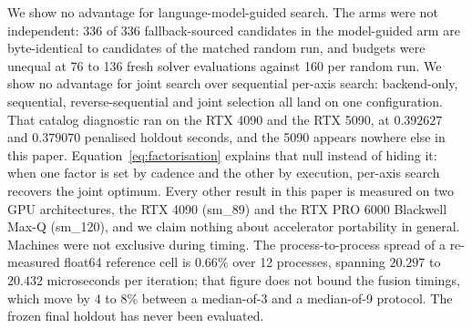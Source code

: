We show no advantage for language-model-guided search. The arms were not
independent: 336 of 336 fallback-sourced candidates in the model-guided arm are
byte-identical to candidates of the matched random run, and budgets were
unequal at 76 to 136 fresh solver evaluations against 160 per random run.
We show no advantage for joint search over sequential per-axis search:
backend-only, sequential, reverse-sequential and joint selection all land on one
configuration. That catalog diagnostic ran on the RTX 4090 and the RTX 5090, at
$0.392627$ and $0.379070$ penalised holdout seconds, and the 5090 appears
nowhere else in this paper.
Equation~\ref{eq:factorisation} explains that null instead of hiding it: when
one factor is set by cadence and the other by execution, per-axis search
recovers the joint optimum. Every other result in this paper is measured on two
GPU architectures, the RTX 4090 (sm\_89) and the RTX PRO 6000 Blackwell Max-Q
(sm\_120), and we claim nothing about accelerator portability in general.
Machines were not exclusive during timing. The process-to-process spread of a
re-measured float64 reference cell is $0.66\%$ over 12 processes, spanning
$20.297$ to $20.432$ microseconds per iteration; that figure does not bound the
fusion timings, which move by 4 to $8\%$ between a median-of-3 and a
median-of-9 protocol.
The frozen final holdout has never been evaluated.
